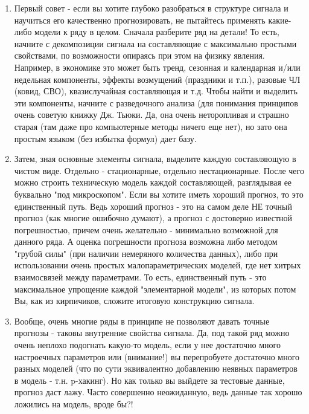 \begin{enumerate}
  \item Первый совет - если вы хотите глубоко разобраться в структуре
    сигнала и научиться его качественно прогнозировать, не пытайтесь
    применять какие-либо модели к ряду в целом. Сначала разберите ряд на
    детали! То есть, начните с декомпозиции сигнала на составляющие с
    максимально простыми свойствами, по возможности опираясь при этом на
    физику явления. Например, в экономике это может быть тренд, сезонная
    и календарная и/или недельная компоненты, эффекты возмущений
    (праздники и т.п.), разовые ЧЛ (ковид, СВО), квазислучайная
    составляющая и т.д. Чтобы найти и выделить эти компоненты, начните с
    разведочного анализа (для понимания принципов очень советую книжку
      Дж. Тьюки. Да, она очень неторопливая и страшно старая (там даже про
      компьютерные методы ничего еще нет), но зато она простым языком (без
      избытка формул) дает базу.
    \item Затем, зная основные элементы сигнала, выделите каждую
      составляющую в чистом виде. Отдельно - стационарные, отдельно
      нестационарные. После чего можно строить техническую модель каждой
      составляющей, разглядывая ее буквально "под микроскопом". Если вы
      хотите иметь хороший прогноз, то это единственный путь. Ведь хороший
      прогноз - это на самом деле НЕ точный прогноз (как многие ошибочно
      думают), а прогноз с достоверно известной погрешностью, причем очень
      желательно - минимально возможной для данного ряда. А оценка
      погрешности прогноза возможна либо методом "грубой силы" (при наличии
      немеряного количества данных), либо при использовании очень простых
      малопараметрических моделей, где нет хитрых взаимосвязей между
      параметрами. То есть, единственный путь - это максимальное упрощение
      каждой "элементарной модели", из которых потом Вы, как из кирпичиков,
      сложите итоговую конструкцию сигнала.
    \item Вообще, очень многие ряды в принципе не позволяют давать точные
      прогнозы - таковы внутренние свойства сигнала. Да, под такой ряд
      можно очень неплохо подогнать какую-то модель, если у нее достаточно
      много настроечных параметров или (внимание!) вы перепробуете
      достаточно много разных моделей (что по сути эквивалентно добавлению
      неявных параметров в модель - т.н. p-хакинг). Но как только вы
      выйдете за тестовые данные, прогноз даст лажу. Часто совершенно
      неожиданную, ведь данные так хорошо ложились на модель, вроде бы?!

\end{enumerate}
